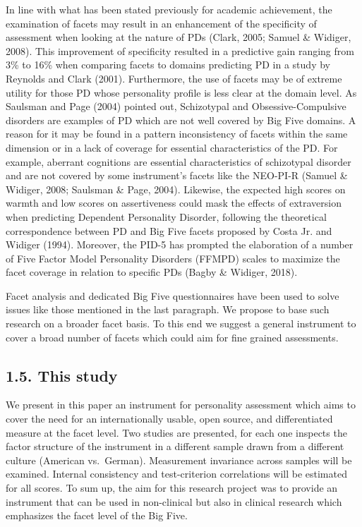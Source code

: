 \documentclass[,man,floatsintext]{apa6}
\theoremstyle{definition}
\theoremstyle{definition}
\theoremstyle{definition}
\theoremstyle{remark}
\begin{document}
In line with what has been stated previously for academic achievement,
the examination of facets may result in an enhancement of the
specificity of assessment when looking at the nature of PDs (Clark,
2005; Samuel \& Widiger, 2008). This improvement of specificity resulted
in a predictive gain ranging from 3\% to 16\% when comparing facets to
domains predicting PD in a study by Reynolds and Clark (2001).
Furthermore, the use of facets may be of extreme utility for those PD
whose personality profile is less clear at the domain level. As Saulsman
and Page (2004) pointed out, Schizotypal and Obsessive-Compulsive
disorders are examples of PD which are not well covered by Big Five
domains. A reason for it may be found in a pattern inconsistency of
facets within the same dimension or in a lack of coverage for essential
characteristics of the PD. For example, aberrant cognitions are
essential characteristics of schizotypal disorder and are not covered by
some instrument's facets like the NEO-PI-R (Samuel \& Widiger, 2008;
Saulsman \& Page, 2004). Likewise, the expected high scores on warmth
and low scores on assertiveness could mask the effects of extraversion
when predicting Dependent Personality Disorder, following the
theoretical correspondence between PD and Big Five facets proposed by
Costa Jr. and Widiger (1994). Moreover, the PID-5 has prompted the
elaboration of a number of Five Factor Model Personality Disorders
(FFMPD) scales to maximize the facet coverage in relation to specific
PDs (Bagby \& Widiger, 2018).

Facet analysis and dedicated Big Five questionnaires have been used to
solve issues like those mentioned in the last paragraph. We propose to
base such research on a broader facet basis. To this end we suggest a
general instrument to cover a broad number of facets which could aim for
fine grained assessments.

\hypertarget{this-study}{%
\subsection{1.5. This study}\label{this-study}}

We present in this paper an instrument for personality assessment which
aims to cover the need for an internationally usable, open source, and
differentiated measure at the facet level. Two studies are presented,
for each one inspects the factor structure of the instrument in a
different sample drawn from a different culture (American vs.~German).
Measurement invariance across samples will be examined. Internal
consistency and test-criterion correlations will be estimated for all
scores. To sum up, the aim for this research project was to provide an
instrument that can be used in non-clinical but also in clinical
research which emphasizes the facet level of the Big Five.
\end{document}
